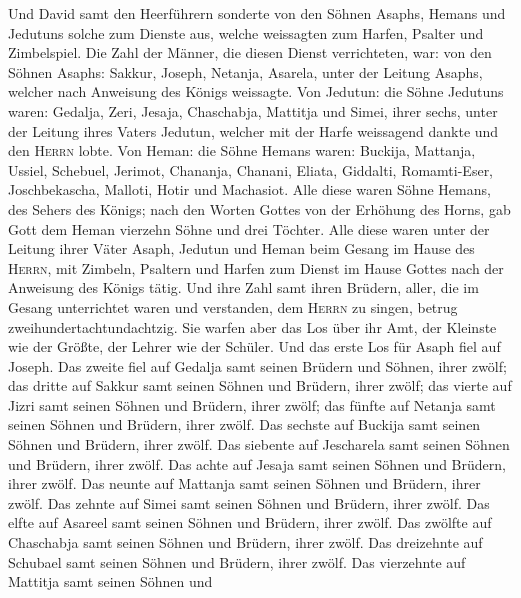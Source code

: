  Und David samt den Heerführern sonderte von den Söhnen
Asaphs, Hemans und Jedutuns solche zum Dienste aus, welche weissagten
zum Harfen, Psalter und Zimbelspiel. Die Zahl der Männer, die diesen
Dienst verrichteten, war:  von den Söhnen Asaphs: Sakkur,
Joseph, Netanja, Asarela, unter der Leitung Asaphs, welcher nach
Anweisung des Königs weissagte.  Von Jedutun: die Söhne
Jedutuns waren: Gedalja, Zeri, Jesaja, Chaschabja, Mattitja und Simei,
ihrer sechs, unter der Leitung ihres Vaters Jedutun, welcher mit der
Harfe weissagend dankte und den \textsc{Herrn} lobte.  Von
Heman: die Söhne Hemans waren: Buckija, Mattanja, Ussiel, Schebuel,
Jerimot, Chananja, Chanani, Eliata, Giddalti, Romamti-Eser,
Joschbekascha, Malloti, Hotir und Machasiot.  Alle diese
waren Söhne Hemans, des Sehers des Königs; nach den Worten Gottes von
der Erhöhung des Horns, gab Gott dem Heman vierzehn Söhne und drei
Töchter.  Alle diese waren unter der Leitung ihrer Väter
Asaph, Jedutun und Heman beim Gesang im Hause des \textsc{Herrn}, mit
Zimbeln, Psaltern und Harfen zum Dienst im Hause Gottes nach der
Anweisung des Königs tätig.  Und ihre Zahl samt ihren
Brüdern, aller, die im Gesang unterrichtet waren und verstanden, dem
\textsc{Herrn} zu singen, betrug zweihundertachtundachtzig.
 Sie warfen aber das Los über ihr Amt, der Kleinste wie
der Größte, der Lehrer wie der Schüler.  Und das erste Los
für Asaph fiel auf Joseph. Das zweite fiel auf Gedalja samt seinen
Brüdern und Söhnen, ihrer zwölf;  das dritte auf Sakkur
samt seinen Söhnen und Brüdern, ihrer zwölf;  das vierte
auf Jizri samt seinen Söhnen und Brüdern, ihrer zwölf; 
das fünfte auf Netanja samt seinen Söhnen und Brüdern, ihrer zwölf.
 Das sechste auf Buckija samt seinen Söhnen und Brüdern,
ihrer zwölf.  Das siebente auf Jescharela samt seinen
Söhnen und Brüdern, ihrer zwölf.  Das achte auf Jesaja
samt seinen Söhnen und Brüdern, ihrer zwölf.  Das neunte
auf Mattanja samt seinen Söhnen und Brüdern, ihrer zwölf.
 Das zehnte auf Simei samt seinen Söhnen und Brüdern,
ihrer zwölf.  Das elfte auf Asareel samt seinen Söhnen
und Brüdern, ihrer zwölf.  Das zwölfte auf Chaschabja
samt seinen Söhnen und Brüdern, ihrer zwölf.  Das
dreizehnte auf Schubael samt seinen Söhnen und Brüdern, ihrer zwölf.
 Das vierzehnte auf Mattitja samt seinen Söhnen und
